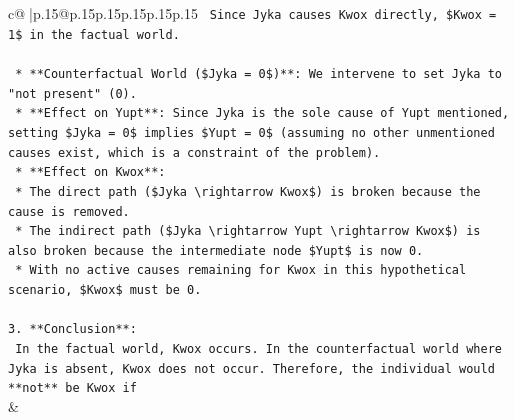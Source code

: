 \documentclass{article}
\begin{document}
{\begin{supertabular}{c@{$\;$}|p{.15\linewidth}@{}p{.15\linewidth}p{.15\linewidth}p{.15\linewidth}p{.15\linewidth}p{.15\linewidth}}
{{{\texttt{        Since Jyka causes Kwox directly, \$Kwox = 1\$ in the factual world.} \\
\\ 
\texttt{    *   **Counterfactual World (\$Jyka = 0\$)**: We intervene to set Jyka to "not present" (0).} \\
\texttt{        *   **Effect on Yupt**: Since Jyka is the sole cause of Yupt mentioned, setting \$Jyka = 0\$ implies \$Yupt = 0\$ (assuming no other unmentioned causes exist, which is a constraint of the problem).} \\
\texttt{        *   **Effect on Kwox**:} \\
\texttt{            *   The direct path (\$Jyka \textbackslash{}rightarrow Kwox\$) is broken because the cause is removed.} \\
\texttt{            *   The indirect path (\$Jyka \textbackslash{}rightarrow Yupt \textbackslash{}rightarrow Kwox\$) is also broken because the intermediate node \$Yupt\$ is now 0.} \\
\texttt{        *   With no active causes remaining for Kwox in this hypothetical scenario, \$Kwox\$ must be 0.} \\
\\ 
\texttt{3.  **Conclusion**:} \\
\texttt{    In the factual world, Kwox occurs. In the counterfactual world where Jyka is absent, Kwox does not occur. Therefore, the individual would **not** be Kwox if} \\
            }
        }
    }
    & \\ \\


\end{supertabular}}
\end{document}
